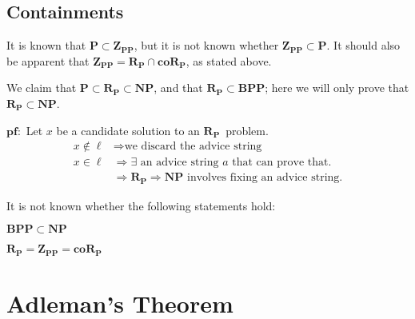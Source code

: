 \documentclass[11pt]{article}
\newcommand{\Pt}{\ensuremath{\mathbf{P}}}
\newcommand{\NP}{\ensuremath{\mathbf{NP}}}
\newcommand{\BPP}{\ensuremath{\mathbf{BPP}}}
\newcommand{\ZPP}{\ensuremath{\mathbf{Z_{PP}}}}
\newcommand{\RP}{\ensuremath{\mathbf{R_{P}}}}
\newcommand{\coRP}{\ensuremath{\mathbf{coR_{P}}}}
\begin{document}
\subsection{Containments}

It is known that $\Pt\subset\ZPP$, but it is not known whether $\ZPP\subset\Pt$.
It should also be apparent that $\ZPP = \RP\cap\coRP$, as stated above.

We claim that $\Pt\subset\RP\subset\NP$, and that $\RP\subset\BPP$; here we will only prove that $\RP\subset\NP$.

$\mathbf{pf: }$
Let $x$ be a candidate solution to an \RP\ problem. 
\begin{align*}
  x\notin\ell &\Rightarrow \text{we discard the advice string}\\
  x\in\ell &\Rightarrow \exists\text{ an advice string $a$ that can prove that.}\\
  &\Rightarrow \RP \Rightarrow \NP \text{ involves fixing an advice string.} 
\end{align*}

It is not known whether the following statements hold:

$\BPP\subset\NP$

$\RP=\ZPP=\coRP$

\section{Adleman's Theorem}



\begin{thebibliography}{42}


\end{thebibliography}
\end{document}
